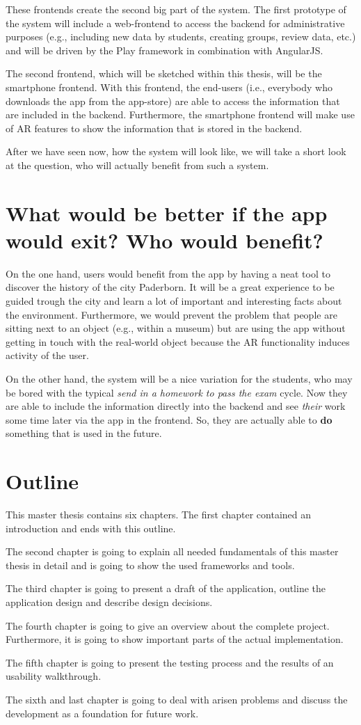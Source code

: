 These frontends create the second big part of the system. The first prototype of the system will include a web-frontend to access the backend for administrative purposes (e.g., including new data by students, creating groups, review data, etc.) and will be driven by the Play framework in combination with AngularJS. 

The second frontend, which will be sketched within this thesis, will be the smartphone frontend. With this frontend, the end-users (i.e., everybody who downloads the app from the app-store) are able to access the information that are included in the backend. Furthermore, the smartphone frontend will make use of \ac{AR} features to show the information that is stored in the backend. 

After we have seen now, how the system will look like, we will take a short look at the question, who will actually benefit from such a system.   

\section{What would be better if the app would exit? Who would benefit?}
On the one hand, users would benefit from the app by having a neat tool to discover the history of the city Paderborn. It will be a great experience to be guided trough the city and learn a lot of important and interesting facts about the environment. Furthermore, we would prevent the problem that people are sitting next to an object (e.g., within a museum) but are using the app without getting in touch with the real-world object because the \ac{AR} functionality induces activity of the user.  

On the other hand, the system will be a nice variation for the students, who may be bored with the typical \textit{send in a homework to pass the exam} cycle. Now they are able to include the information directly into the backend and see \textit{their} work some time later via the app in the frontend. So, they are actually able to \textbf{do} something that is used in the future.    

\section{Outline}
This master thesis contains six chapters. The first chapter contained an introduction and ends with this outline.

The second chapter is going to explain all needed fundamentals of this master thesis in detail and is going to show the used frameworks and tools.

The third chapter is going to present a draft of the application, outline the application design and describe design decisions.

The fourth chapter is going to give an overview about the complete project. Furthermore, it is going to show important parts of the actual implementation.

The fifth chapter is going to present the testing process and the results of an usability walkthrough. 

The sixth and last chapter is going to deal with arisen problems and discuss the development as a foundation for future work.
